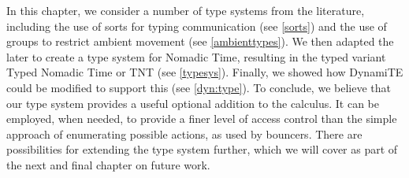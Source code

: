 In this chapter, we consider a number of type systems from the
literature, including the use of sorts for typing communication (see
\ref{sorts}) and the use of groups to restrict ambient movement (see
\ref{ambienttypes}).  We then adapted the later to create a type
system for Nomadic Time, resulting in the typed variant Typed Nomadic
Time or TNT (see \ref{typesys}). Finally, we showed how DynamiTE could
be modified to support this (see \ref{dyn:type}).  To conclude, we
believe that our type system provides a useful optional addition to
the calculus.  It can be employed, when needed, to provide a finer
level of access control than the simple approach of enumerating
possible actions, as used by bouncers.  There are possibilities for
extending the type system further, which we will cover as part of the
next and final chapter on future work.
